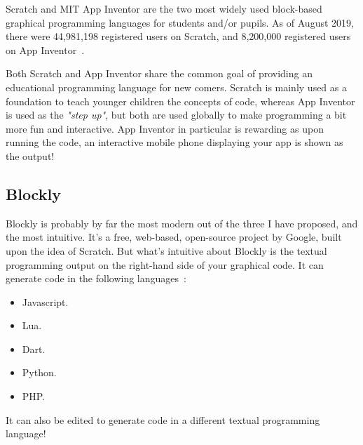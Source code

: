 \documentclass[a4paper, 12pt]{article}
\begin{document}
            \clearpage
            Scratch and MIT App Inventor are the two most widely used block-based graphical programming
            languages for students and/or pupils. As of August 2019, there were 44,981,198 registered
            users on Scratch, and 8,200,000 registered users on App Inventor~\cite{park2019comparing}.

            Both Scratch and App Inventor share the common goal of providing an educational programming
            language for new comers. Scratch is mainly used as a foundation to teach younger children
            the concepts of code, whereas App Inventor is used as the \textit{"step up"}, but both are
            used globally to make programming a bit more fun and interactive. App Inventor in particular
            is rewarding as upon running the code, an interactive mobile phone displaying your app is
            shown as the output!

        \subsection{Blockly}
            Blockly is probably by far the most modern out of the three I have proposed, and the 
            most intuitive. It's a free, web-based, open-source project by Google, built upon the 
            idea of Scratch. But what's intuitive about Blockly is the textual programming output 
            on the right-hand side of your graphical code. It can generate code in the following 
            languages~\cite{nbcbayarea}:

            \begin{itemize}
                \item Javascript.
                \item Lua.
                \item Dart.
                \item Python.
                \item PHP.
            \end{itemize}

            It can also be edited to generate code in a different textual programming language!
\end{document}
